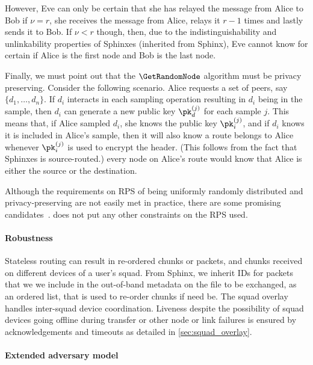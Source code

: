 However, Eve can only be certain that she has relayed the message from Alice to 
Bob if \(\nu = r\), \ie she receives the message from Alice, relays it \(r-1\) 
times and lastly sends it to Bob.
If \(\nu < r\) though, then, due to the indistinguishability and unlinkability 
properties of Sphinxes (inherited from Sphinx), Eve cannot know for certain if 
Alice is the first node and Bob is the last node. 


Finally, we must point out that the \(\GetRandomNode\) algorithm must be 
privacy preserving.
Consider the following scenario.
Alice requests a set of peers, say \(\{d_1, \dotsc, d_n\}\).
If \(d_i\) interacts in each sampling operation resulting in \(d_i\) being in 
the sample, then \(d_i\) can generate a new public key \(\pk_d^{(j)}\) for each 
sample \(j\).
This means that, if Alice sampled \(d_i\), she knows the public key 
\(\pk_i^{(j)}\), and if \(d_i\) knows it is included in Alice's sample, then it 
will also know a route belongs to Alice whenever \(\pk_i^{(j)}\) is used to 
encrypt the header.
(This follows from the fact that Sphinxes is source-routed.)
\Ie every node on Alice's route would know that Alice is either the source or 
the destination.

Although the requirements on \ac{RPS} of being uniformly randomly
distributed and privacy-preserving are not easily met in practice,
there are some promising candidates~\cite{Octopus, BrahmsRPS}.\name
does not put any other constraints on the \ac{RPS} used.

\paragraph*{Robustness}

Stateless routing can result in re-ordered chunks or packets, and
chunks received on different devices of a user's squad. From Sphinx,
we inherit IDs for packets that we we include in the out-of-band
metadata on the file to be exchanged, as an ordered list, that is used
to re-order chunks if need be. The squad overlay handles inter-squad
device coordination. Liveness despite the possibility of squad devices
going offline during transfer or other node or link failures is
ensured by acknowledgements and timeouts as detailed in 
\cref{sec:squad_overlay}.


\paragraph*{Extended adversary model}%
\label{security-limitations}

